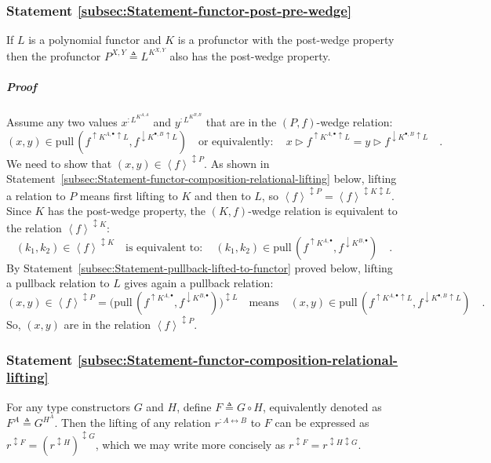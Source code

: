 \subsubsection{Statement \label{subsec:Statement-functor-post-pre-wedge}\ref{subsec:Statement-functor-post-pre-wedge}}

If $L$ is a polynomial functor and $K$ is a profunctor with the
post-wedge property then the profunctor $P^{X,Y}\triangleq L^{K^{X,Y}}$
also has the post-wedge property.

\subparagraph{Proof}

Assume any two values $x^{:L^{K^{A,A}}}$ and $y^{:L^{K^{B,B}}}$
that are in the $\left(P,f\right)$-wedge relation:
\[
(x,y)\in\text{pull}\,(f^{\uparrow K^{A,\bullet}\uparrow L},f^{\downarrow K^{\bullet,B}\uparrow L})\quad\text{or equivalently}:\quad x\triangleright f^{\uparrow K^{A,\bullet}\uparrow L}=y\triangleright f^{\downarrow K^{\bullet,B}\uparrow L}\quad.
\]
We need to show that $\left(x,y\right)\in\left<f\right>^{\updownarrow P}$.
As shown in Statement~\ref{subsec:Statement-functor-composition-relational-lifting}
below, lifting a relation to $P$ means first lifting to $K$ and
then to $L$, so $\left<f\right>^{\updownarrow P}=\left<f\right>^{\updownarrow K\updownarrow L}$.
Since $K$ has the post-wedge property, the $\left(K,f\right)$-wedge
relation is equivalent to the relation $\left<f\right>^{\updownarrow K}$:
\[
(k_{1},k_{2})\in\left<f\right>^{\updownarrow K}\quad\text{is equivalent to}:\quad(k_{1},k_{2})\in\text{pull}\,(f^{\uparrow K^{A,\bullet}},f^{\downarrow K^{B,\bullet}})\quad.
\]
By Statement~\ref{subsec:Statement-pullback-lifted-to-functor} proved
below, lifting a pullback relation to $L$ gives again a pullback
relation:
\[
\left(x,y\right)\in\left<f\right>^{\updownarrow P}=\big(\text{pull}\,(f^{\uparrow K^{A,\bullet}},f^{\downarrow K^{B,\bullet}})\big)^{\updownarrow L}\quad\text{means}\quad(x,y)\in\text{pull}\,(f^{\uparrow K^{A,\bullet}\uparrow L},f^{\downarrow K^{\bullet,B}\uparrow L})\quad.
\]
So, $\left(x,y\right)$ are in the relation $\left<f\right>^{\updownarrow P}$.

\subsubsection{Statement \label{subsec:Statement-functor-composition-relational-lifting}\ref{subsec:Statement-functor-composition-relational-lifting}}

For any type constructors $G$ and $H$, define $F\triangleq G\circ H$,
equivalently denoted as $F^{A}\triangleq G^{H^{A}}$. Then the lifting
of any relation $r^{:A\leftrightarrow B}$ to $F$ can be expressed
as $r^{\updownarrow F}=(r^{\updownarrow H})^{\updownarrow G}$, which
we may write more concisely as $r^{\updownarrow F}=r^{\updownarrow H\updownarrow G}$.

